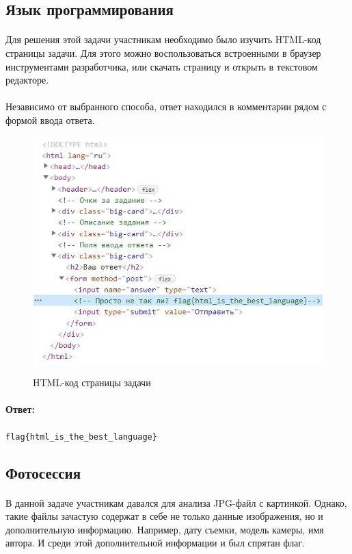 \documentclass[12pt]{article}
\begin{document}
    \subsection{Язык программирования}
	\paragraph{}
    Для решения этой задачи участникам необходимо было изучить HTML-код страницы задачи.
	Для этого можно воспользоваться встроенными в браузер инструментами разработчика,
	или скачать страницу и открыть в текстовом редакторе.
	\paragraph{}
	Независимо от выбранного способа, ответ находился в комментарии рядом с формой ввода ответа.
    \begin{figure}[H]
        \centering
        \includegraphics[width=12cm]{task45}
        \label{fig:task45}
        \caption{HTML-код страницы задачи}
    \end{figure}
    \paragraph{Ответ:}
    \verb|flag{html_is_the_best_language}|

    \subsection{Фотосессия}
	\paragraph{}
    В данной задаче участникам давался для анализа JPG-файл с картинкой.
	Однако, такие файлы зачастую содержат в себе не только данные изображения, но и дополнительную информацию.
	Например, дату съемки, модель камеры, имя автора.
	И среди этой дополнительной информации и был спрятан флаг.
\end{document}
